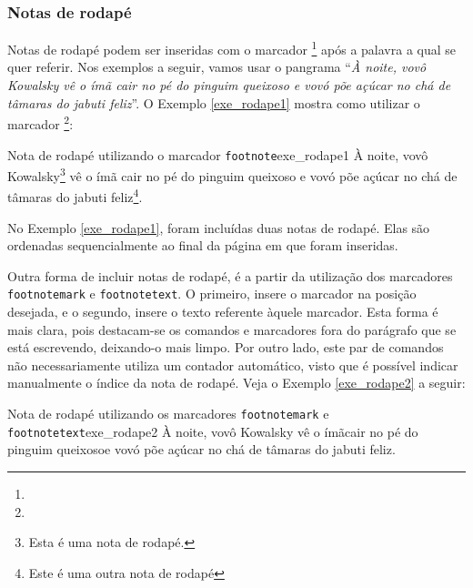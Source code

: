 
\subsubsection*{Notas de rodapé}
\label{sec:notas_rodape}

Notas de rodapé podem ser inseridas com o marcador \texttt{\footnote{}} após a palavra a qual se quer referir. Nos exemplos a seguir, vamos usar o pangrama\footnotemark{} ``\textit{À noite, vovô Kowalsky vê o ímã cair no pé do pinguim queixoso e vovó põe açúcar no chá de tâmaras do jabuti feliz\footnotemark{}}''. O Exemplo \ref{exe_rodape1} mostra como utilizar o marcador \texttt{\footnote{}}:

\begin{texexptitled}[breakable,enhanced,middle=2mm]{Nota de rodapé utilizando o marcador {\tt footnote}}{exe_rodape1}
À noite, vovô Kowalsky\footnote{Esta é uma nota de rodapé.} vê o ímã cair no pé do pinguim queixoso e vovó põe açúcar no chá de tâmaras do jabuti feliz\footnote{Este é uma outra nota de rodapé}.
\end{texexptitled}

\addtocounter{footnote}{-2}

No Exemplo \ref{exe_rodape1}, foram incluídas duas notas de rodapé. Elas são ordenadas sequencialmente ao final da página em que foram inseridas.

Outra forma de incluir notas de rodapé, é a partir da utilização dos marcadores {\tt footnotemark} e {\tt footnotetext}. O primeiro, insere o marcador na posição desejada, e o segundo, insere o texto referente àquele marcador. Esta forma é mais clara, pois destacam-se os comandos e marcadores fora do parágrafo que se está escrevendo, deixando-o mais limpo. Por outro lado, este par de comandos não necessariamente utiliza um contador automático, visto que é possível indicar manualmente o índice da nota de rodapé. Veja o Exemplo \ref{exe_rodape2} a seguir:

\begin{texexptitled}[breakable,enhanced,middle=2mm]{Nota de rodapé utilizando os marcadores {\tt footnotemark} e {\tt footnotetext}}{exe_rodape2}
À noite, vovô Kowalsky vê o ímã\footnotemark[1] cair no pé do pinguim queixoso\footnotemark[2] e vovó põe açúcar no chá de tâmaras do jabuti feliz.

\end{texexptitled}

